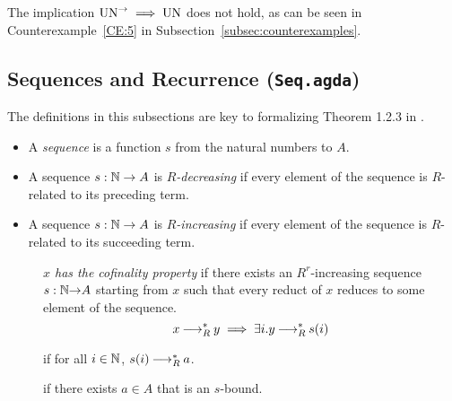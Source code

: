 \begin{remark}
    The implication $\mathrm{UN}^{\to} \implies \mathrm{UN}$ does not hold, as can be seen in Counterexample~\ref{CE:5} in Subsection~\ref{subsec:counterexamples}.
\end{remark}

\subsection{Sequences and Recurrence (\texttt{Seq.agda})}
The definitions in this subsections are key to formalizing Theorem 1.2.3 in \terese.

\begin{definition} \label{def:seq} \hfill
  \begin{itemize}
    \item A \emph{sequence} is a function $s$ from the natural numbers to $A$.
    \item A sequence $s : \mathbb{N} \to A$ is \emph{$R$-decreasing} if every element of the sequence is $R$-related to its preceding term.
    \item A sequence $s : \mathbb{N} \to A$ is \emph{$R$-increasing} if every element of the sequence is $R$-related to its succeeding term.
  \end{itemize}
\end{definition}

\begin{definition}\hfill
    \begin{description}
        \item[] \emph{$x$ has the cofinality property} if there exists an $R^r$-increasing sequence
        \mbox{$s : \mathbb{N} {\to} A$} starting from $x$ such that every
        reduct of $x$ reduces to some element of the sequence.
        \[ x \mathbin{\longrightarrow_R^*} y \implies \exists i. y \mathbin{\longrightarrow_R^*} s(i) \]
    \end{description}
\end{definition}

\begin{definition} \label{def:bound} \hfill
  \begin{description}
    \item[] if for all $i \in \mathbb{N}$, $s (i) \mathbin{\longrightarrow_R^*} a$.
    \item[] if there exists $a \in A$ that is an $s$-bound.
  \end{description}
\end{definition}


